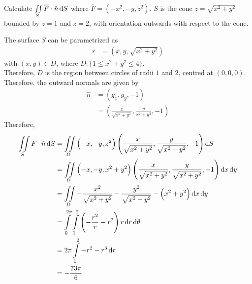 \documentclass[fleqn, a4paper, 12pt, twoside]{article}
\theoremstyle{definition}
\theoremstyle{theorem}
\begin{document}
\begin{question}
	Calculate $\iint\limits_{S} \overline{F} \cdot \hat{n} \dif S$ where $\overline{F} = \left( -x^2 , -y , z^2 \right)$.
	$S$ is the cone $z = \sqrt{x^2 + y^2}$ bounded by $z = 1$ and $z = 2$, with orientation outwards with respect to the cone.
\end{question}

\begin{solution}
	The surface $S$ can be parametrized as
	\begin{align*}
		\overline{r} & = \left( x,y,\sqrt{x^2 + y^2} \right)
	\end{align*}
	with $(x,y) \in D$, where $D : \{1 \le x^2 + y^2 \le 4\}$.\\
	Therefore, $D$ is the region between circles of radii $1$ and $2$, centred at $(0,0,0)$.\\
	Therefore, the outward normals are given by
	\begin{align*}
		\hat{n} & = (g_x , g_y , -1) \\
                        & = \left( \frac{x}{\sqrt{x^2 + y^2}} , \frac{y}{x^2 + y^2} , -1 \right)
	\end{align*}
	Therefore,
	\begin{align*}
		\iint\limits_{S} \overline{F} \cdot \hat{n} \dif S & = \iint\limits_{D} \left( -x , -y , z^2 \right) \left( \frac{x}{\sqrt{x^2 + y^2}} , \frac{y}{\sqrt{x^2 + y^2}} , -1 \right) \dif S             \\
                                                                   & = \iint\limits_{D} \left( -x , -y, x^2 + y^2 \right) \left( \frac{x}{\sqrt{x^2 + y^2}} , \frac{y}{\sqrt{x^2 + y^2}} , -1 \right) \dif x \dif y \\
                                                                   & = \iint\limits_{D} -\frac{x^2}{\sqrt{x^2 + y^2}} - \frac{y^2}{\sqrt{x^2 + y^2}} - \left( x^2 + y^2 \right) \dif x \dif y                       \\
                                                                   & = \int\limits_{0}^{2 \pi} \int\limits_{1}^{2} \left( -\frac{r^2}{r} - r^2 \right) r \dif r \dif \theta                                         \\
                                                                   & = 2 \pi \int\limits_{1}^{2} -r^2 - r^3 \dif r                                                                                                  \\
                                                                   & = -\frac{73 \pi}{6}

\end{align*}
\end{solution}
\end{document}
